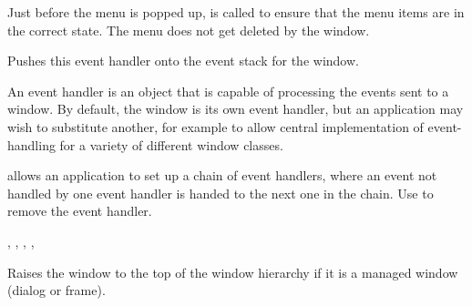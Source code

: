 
Just before the menu is popped up,  is called
to ensure that the menu items are in the correct state. The menu does not get deleted
by the window.


\label{wxwindowpusheventhandler}


Pushes this event handler onto the event stack for the window.




An event handler is an object that is capable of processing the events
sent to a window. By default, the window is its own event handler, but
an application may wish to substitute another, for example to allow
central implementation of event-handling for a variety of different
window classes.

 allows
an application to set up a chain of event handlers, where an event not handled by one event handler is
handed to the next one in the chain. Use  to
remove the event handler.


,\rtfsp
{},\rtfsp
{},\rtfsp
{},\rtfsp
{}

\label{wxwindowraise}


Raises the window to the top of the window hierarchy if it is a managed window (dialog
or frame).

